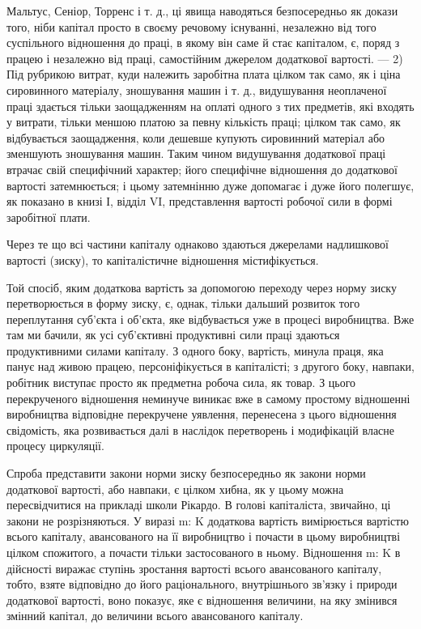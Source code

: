 Мальтус, Сеніор, Торренс і т. д., ці явища наводяться безпосередньо
як докази того, ніби капітал просто в своєму речовому
існуванні, незалежно від того суспільного відношення до
праці, в якому він саме й стає капіталом, є, поряд з працею
і незалежно від праці, самостійним джерелом додаткової вартості.
— 2) Під рубрикою витрат, куди належить заробітна плата
цілком так само, як і ціна сировинного матеріалу, зношування
машин і т. д., видушування неоплаченої праці здається тільки
заощадженням на оплаті одного з тих предметів, які входять
у витрати, тільки меншою платою за певну кількість праці;
цілком так само, як відбувається заощадження, коли дешевше
купують сировинний матеріал або зменшують зношування машин.
Таким чином видушування додаткової праці втрачає свій
специфічний характер; його специфічне відношення до додаткової
вартості затемнюється; і цьому затемнінню дуже допомагає
і дуже його полегшує, як показано в книзі І, відділ VI,
представлення вартості робочої сили в формі заробітної плати.

Через те що всі частини капіталу однаково здаються джерелами
надлишкової вартості (зиску), то капіталістичне відношення
містифікується.

Той спосіб, яким додаткова вартість за допомогою переходу
через норму зиску перетворюється в форму зиску, є, однак,
тільки дальший розвиток того переплутання суб’єкта і об’єкта,
яке відбувається уже в процесі виробництва. Вже там ми бачили,
як усі суб’єктивні продуктивні сили праці здаються продуктивними
силами капіталу. З одного боку, вартість, минула праця,
яка панує над живою працею, персоніфікується в капіталісті;
з другого боку, навпаки, робітник виступає просто як предметна
робоча сила, як товар. З цього перекрученого відношення неминуче
виникає вже в самому простому відношенні виробництва
відповідне перекручене уявлення, перенесена з цього відношення
свідомість, яка розвивається далі в наслідок перетворень і модифікацій
власне процесу циркуляції.

Спроба представити закони норми зиску безпосередньо як закони
норми додаткової вартості, або навпаки, є цілком хибна, як
у цьому можна пересвідчитися на прикладі школи Рікардо. В голові
капіталіста, звичайно, ці закони не розрізняються. У виразі m: K
додаткова вартість вимірюється вартістю всього капіталу, авансованого
на її виробництво і почасти в цьому виробництві цілком спожитого,
а почасти тільки застосованого в ньому. Відношення m: K в
дійсності виражає ступінь зростання вартості всього авансованого
капіталу, тобто, взяте відповідно до його раціонального, внутрішнього
зв’язку і природи додаткової вартості, воно показує,
яке є відношення величини, на яку змінився змінний капітал, до
величини всього авансованого капіталу.
